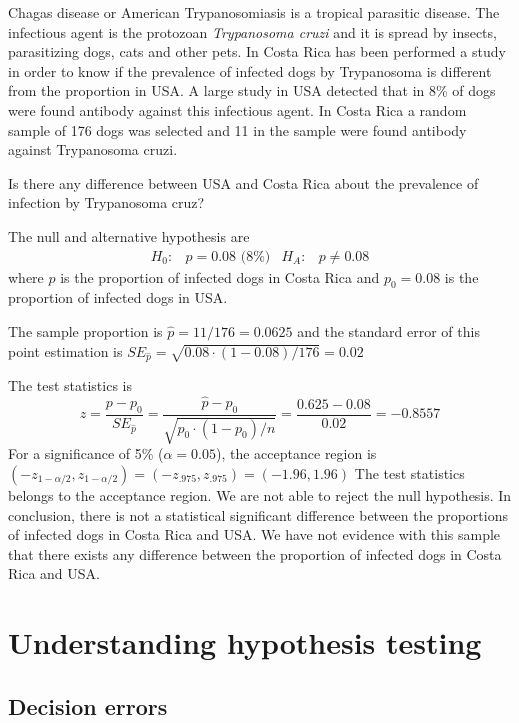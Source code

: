 \begin{examplewrap}
  \begin{nexample}{
    Chagas disease or American Trypanosomiasis is a tropical parasitic
    disease. The infectious agent is the protozoan \emph{Trypanosoma
      cruzi} and it is spread by insects, parasitizing dogs, cats and
    other pets. In Costa Rica has been performed a study in order to
    know if the prevalence of infected dogs by Trypanosoma is
    different from the proportion in USA. A large study in USA
    detected that in  8\% of dogs were found antibody  against this
    infectious agent. 
In Costa Rica a random sample of 176 dogs was selected and 11 in the
sample were found  antibody against Trypanosoma
      cruzi. 

Is there any difference between USA and Costa Rica about the
prevalence of infection by  Trypanosoma
      cruz?
}
  The null and alternative hypothesis are 
\begin{align*}
  H_0: & p=0.08 \mbox{ (8\%)} & H_A:& p\neq 0.08
\end{align*}
where $p$ is the proportion of infected dogs in Costa Rica and
$p_0=0.08$ is the proportion of infected dogs in USA.

The sample proportion is $\hat{p}=11/176=0.0625$ and the standard error of this point estimation is $SE_{\hat{p}}=\sqrt{0.08\cdot(1-0.08)/176}=0.02$ 

The test statistics is 
$$z=\frac{p-p_0}{SE_{\hat{p}}}=\frac{\hat{p}-p_0}{\sqrt{p_0\cdot(1-p_0)/n}}=\frac{0.625-0.08}{0.02}=-0.8557$$
  For a significance of 5\% ($\alpha=0.05$), the acceptance region is
  $(-z_{1-\alpha/2},z_{1-\alpha/2})=(-z_{.975},z_{.975})=(-1.96,1.96)$
The test statistics belongs to  the acceptance region. We are not able
to reject the null hypothesis. In conclusion, 
there is not a statistical significant difference between the proportions of
infected dogs in Costa Rica and USA. We have not evidence with this sample that there exists any difference between the proportion of infected dogs in Costa Rica and USA.     

  \end{nexample}
\end{examplewrap}

\section{Understanding hypothesis testing}
\label{UnderstandingHT}
\subsection{Decision errors}

